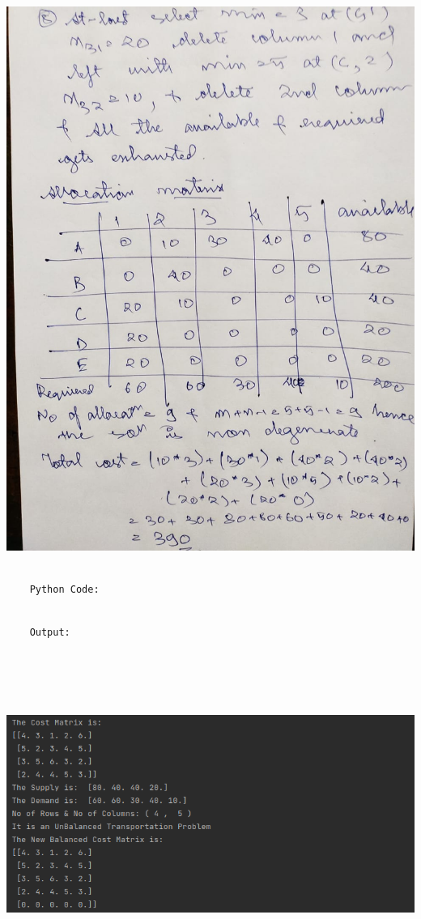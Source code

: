 \documentclass[12pt, letterpaper, twoside]{book}
\begin{document}
\includegraphics[width=\paperwidth, height=\paperheight]{Page13}
\begin{lstlisting}

	Python Code:

\end{lstlisting}

\pagebreak
\begin{lstlisting}

	Output:

\end{lstlisting}

\includegraphics[height=300pt,width=550pt]{Output2}
\end{document}
